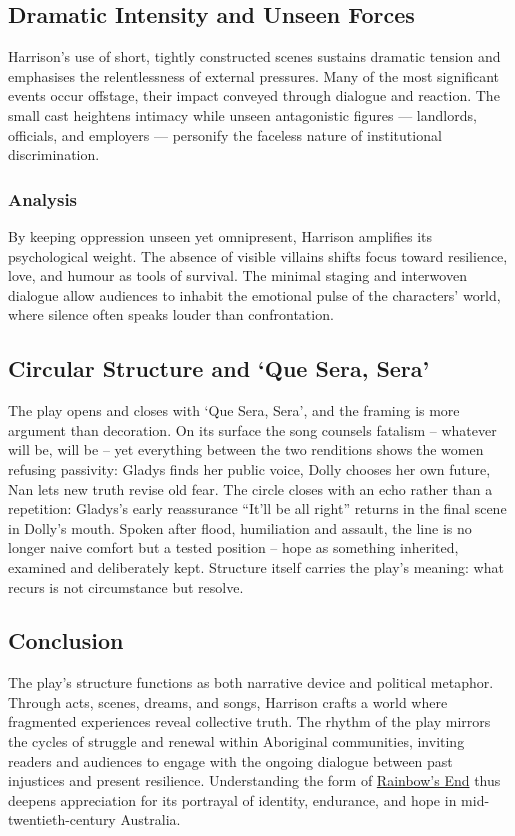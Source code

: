 \documentclass[a4paper]{article}
\begin{document}
\subsection{Dramatic Intensity and Unseen Forces}
Harrison’s use of short, tightly constructed scenes sustains dramatic tension and emphasises the relentlessness of external pressures. Many of the most significant events occur offstage, their impact conveyed through dialogue and reaction. The small cast heightens intimacy while unseen antagonistic figures — landlords, officials, and employers — personify the faceless nature of institutional discrimination.\\

\subsubsection{Analysis}
By keeping oppression unseen yet omnipresent, Harrison amplifies its psychological weight. The absence of visible villains shifts focus toward resilience, love, and humour as tools of survival. The minimal staging and interwoven dialogue allow audiences to inhabit the emotional pulse of the characters’ world, where silence often speaks louder than confrontation.\\

\subsection{Circular Structure and `Que Sera, Sera'}
The play opens and closes with `Que Sera, Sera', and the framing is more argument than decoration. On its surface the song counsels fatalism -- whatever will be, will be -- yet everything between the two renditions shows the women refusing passivity: Gladys finds her public voice, Dolly chooses her own future, Nan lets new truth revise old fear. The circle closes with an echo rather than a repetition: Gladys's early reassurance ``It'll be all right'' returns in the final scene in Dolly's mouth. Spoken after flood, humiliation and assault, the line is no longer naive comfort but a tested position -- hope as something inherited, examined and deliberately kept. Structure itself carries the play's meaning: what recurs is not circumstance but resolve.\\

\subsection{Conclusion}
The play’s structure functions as both narrative device and political metaphor. Through acts, scenes, dreams, and songs, Harrison crafts a world where fragmented experiences reveal collective truth. The rhythm of the play mirrors the cycles of struggle and renewal within Aboriginal communities, inviting readers and audiences to engage with the ongoing dialogue between past injustices and present resilience. Understanding the form of \underline{Rainbow's End} thus deepens appreciation for its portrayal of identity, endurance, and hope in mid-twentieth-century Australia.\\
\end{document}
